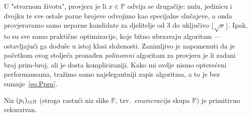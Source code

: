 U "stvarnom životu", provjera je li $x\in\mathbb P$ odvija se drugačije: nulu, jedinicu i dvojku te sve ostale parne brojeve odvojimo kao specijalne slučajeve, a onda provjeravamo samo neparne kandidate za djelitelje od 3 do uključivo $\lfloor\!\sqrt{x}\rfloor$. Ipak, to su sve samo praktične optimizacije, koje bitno ubrzavaju algoritam --- ostavljajući ga doduše u istoj klasi složenosti. Zanimljivo je napomenuti da je početkom ovog stoljeća pronađen \emph{polinomni} algoritam za provjeru je li zadani broj prim-broj, ali je dosta kompliciraniji. Kako mi ovdje nismo opterećeni performansama, tražimo samo najelegantniji zapis algoritma, a to je bez sumnje~\eqref{eq:Pprn}.

\begin{propozicija}[{name=[primitivna rekurzivnost enumeracije skupa $\mathbb P$]}]\label{pp:primeprn}
    Niz $(p_i)_{i\in{\mathbb N}}$ (strogo rastući niz slike $\mathbb P$\!, tzv.\ \emph{enumeracija} skupa $\mathbb P$\!) je primitivno rekurzivan.
\end{propozicija}
